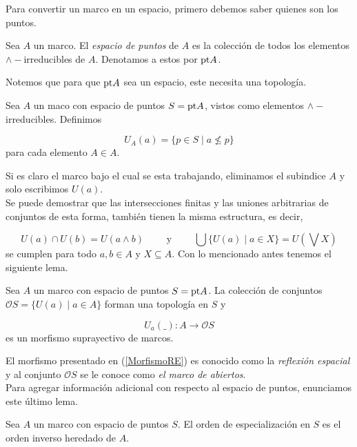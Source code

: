 Para convertir un marco en un espacio, primero debemos saber quienes son los puntos.

\begin{dfn}\label{Espacio de puntos}
    Sea $A$ un marco. El \emph{espacio de puntos} de $A$ es la colección de todos los elementos $\wedge-$irreducibles de $A$. Denotamos a estos por $\mathrm{pt} A$.
\end{dfn}

Notemos que para que $\mathrm{pt} A$ sea un espacio, este necesita una topología.

\begin{dfn}\label{Reflexion espacial}
    Sea $A$ un maco con espacio de puntos $S=\mathrm{pt} A$, vistos como elementos $\wedge-$irreducibles. Definimos 

    \[
    U_A(a)=\{p\in S\mid a\nleq p\}
    \]
    para cada elemento $A\in A$. 
\end{dfn}

Si es claro el marco bajo el cual se esta trabajando, eliminamos el subindice $A$ y solo escribimos $U(a)$.\\

Se puede demostrar que las intersecciones finitas y las uniones arbitrarias de conjuntos de esta forma, también tienen la misma estructura, es decir,

\[
U(a)\cap U(b)=U(a\wedge b)\qquad\mbox{ y }\qquad\bigcup\{U(a)\mid a\in X\}=U\left(\bigvee X\right)
\]
se cumplen para todo $a, b\in A$ y $X\subseteq A$. Con lo mencionado antes tenemos el siguiente lema.

\begin{lem}\label{ReflexionEspacial}
    Sea $A$ un marco con espacio de puntos $S=\mathrm{pt} A$. La colección de conjuntos $\mathcal{O}S=\{U(a)\mid a\in A\}$ forman una topología en $S$ y 

    \begin{equation}\label{MorfismoRE}
            U_a(\_)\colon A\to \mathcal{O}S
    \end{equation}
    es un morfismo suprayectivo de marcos.
\end{lem}
El morfismo presentado en (\ref{MorfismoRE}) es conocido como la \emph{reflexión espacial} y al conjunto $\mathcal{O}S$ se le conoce como \emph{el marco de abiertos}.\\

Para agregar información adicional con respecto al espacio de puntos, enunciamos este último lema.

\begin{lem}\label{Topologiapt}
    Sea $A$ un marco con espacio de puntos $S$. El orden de especialización en $S$ es el orden inverso heredado de $A$. 
\end{lem}

